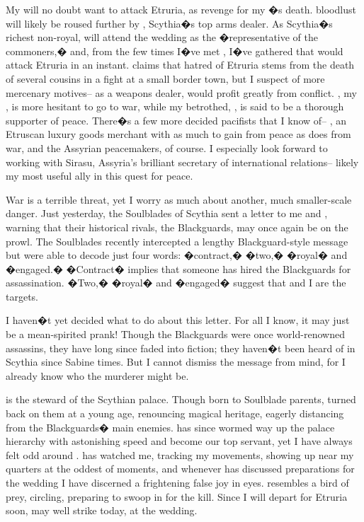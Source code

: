 \documentclass[char]{Kos}
\begin{document}
My \cScythiaQueen{\parent} will no doubt want to attack Etruria, as revenge for my \cFugitive{\sibling}�s death. \cScythiaQueen{\Their} bloodlust will likely be roused further by \cArmsDealer{\name}, Scythia�s top arms dealer. As Scythia�s richest non-royal, \cArmsDealer{\nickname} will attend the wedding as the �representative of the commoners,� and, from the few times I�ve met \cArmsDealer{\them}, I�ve gathered that \cArmsDealer{\they} would attack Etruria in an instant. \cArmsDealer{\They} claims that \cArmsDealer{\their} hatred of Etruria stems from the death of several cousins in a fight at a small border town, but I suspect \cArmsDealer{\them} of more mercenary motives-- as a weapons dealer, \cArmsDealer{\nickname} would profit greatly from conflict. \cScythiaKing{\nickname}, my \cScythiaKing{\parent}, is more hesitant to go to war, while my betrothed, \cGroom{\them}, is said to be a thorough supporter of peace. There�s a few more decided pacifists that I know of-- \cMerchant{\name}, an Etruscan luxury goods merchant with as much to gain from peace as \cArmsDealer{\nickname} does from war, and the Assyrian peacemakers, of course. I especially look forward to working with Sirasu, Assyria's brilliant secretary of international relations-- likely my most useful ally in this quest for peace.

War is a terrible threat, yet I worry as much about another, much smaller-scale danger. Just yesterday, the Soulblades of Scythia sent a letter to me and \cGroom{\nickname}, warning that their historical rivals, the Blackguards, may once again be on the prowl. The Soulblades recently intercepted a lengthy Blackguard-style message but were able to decode just four words: �contract,� �two,� �royal� and �engaged.� �Contract� implies that someone has hired the Blackguards for assassination. �Two,� �royal� and �engaged� suggest that \cGroom{\nickname} and I are the targets.

I haven�t yet decided what to do about this letter. For all I know, it may just be a mean-spirited prank! Though the Blackguards were once world-renowned assassins, they have long since faded into fiction; they haven�t been heard of in Scythia since Sabine times. But I cannot dismiss the message from mind, for I already know who the murderer might be.

 is the steward of the Scythian palace. Though born to Soulblade parents,  turned  back on them at a young age, renouncing  magical heritage, eagerly distancing  from the Blackguards� main enemies.  has since wormed  way up the palace hierarchy with astonishing speed and become our top servant, yet I have always felt odd around .  has watched me, tracking my movements, showing up near my quarters at the oddest of moments, and whenever  has discussed preparations for the wedding I have discerned a frightening false joy in  eyes.  resembles a bird of prey, circling, preparing to swoop in for the kill. Since I will depart for Etruria soon,  may well strike today, at the wedding.
\end{document}

